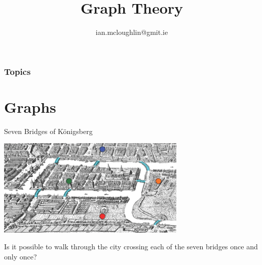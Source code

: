 
\title{Graph Theory}
\subtitle{}
\author{ian.mcloughlin@gmit.ie}
\date{}


\begin{frame}
	\titlepage
\end{frame}

\begin{frame}
	\frametitle{Topics}
	\tableofcontents
\end{frame}

\section{Graphs}

\begin{frame}{Seven Bridges of K{\"o}nigsberg}
	\begin{center}
		\includegraphics[width=9cm]{img/konigsberg.png}
	\end{center}
	Is it possible to walk through the city crossing each of the seven bridges once and only once?
\end{frame}

